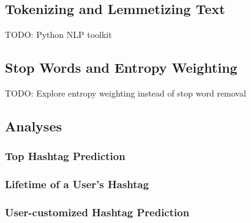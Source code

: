 \documentclass[man]{apa6}
\begin{document}
\subsection{Tokenizing and Lemmetizing Text}

TODO: Python NLP toolkit \cite{Bird2009}

\subsection{Stop Words and Entropy Weighting}

TODO: Explore entropy weighting instead of stop word removal \cite{Dumais1991}

\subsection{Analyses}

\subsubsection{Top Hashtag Prediction}

\subsubsection{Lifetime of a User's Hashtag}

\subsubsection{User-customized Hashtag Prediction}

\printbibliography
\end{document}
